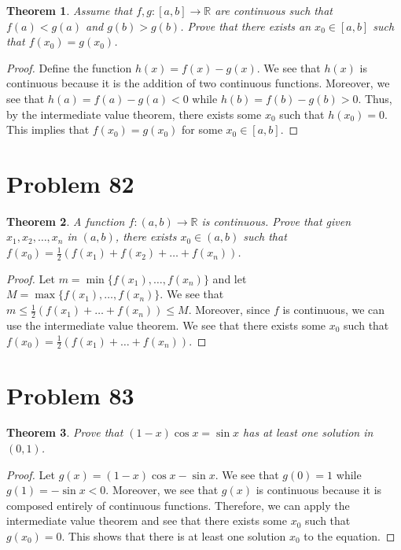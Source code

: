 \documentclass[psamsfonts]{amsart}
\newtheorem{thm}{Theorem}[section]
\theoremstyle{definition}
\theoremstyle{remark}
\numberwithin{equation}{section}
\begin{document}
\begin{thm}
Assume that $f,g: [a,b] \to \mathbb{R}$ are continuous such that $f(a) < g(a)$ and $g(b) > g(b)$. Prove that there exists an $x_0 \in [a,b]$ such that $f(x_0) = g(x_0)$. 
\end{thm}

\begin{proof}
Define the function $h(x) = f(x) - g(x)$. We see that $h(x)$ is continuous because it is the addition of two continuous functions. Moreover, we see that $h(a) = f(a) - g(a) < 0$ while $h(b) = f(b) - g(b) > 0$. Thus, by the intermediate value theorem, there exists some $x_0$ such that $h(x_0) = 0$. This implies that $f(x_0) = g(x_0)$ for some $x_0 \in [a,b]$.
\end{proof}

\section{Problem 82}

\begin{thm}
A function $f: (a,b) \to \mathbb{R}$ is continuous. Prove that given $x_1, x_2, \ldots, x_n$ in $(a,b)$, there exists $x_0 \in (a,b)$ such that $f(x_0) = \frac{1}{2} ( f(x_1) + f(x_2) + \ldots + f(x_n))$. 
\end{thm}

\begin{proof}
Let $m = \min \{f(x_1), \ldots, f(x_n) \}$ and let $M = \max \{ f(x_1), \ldots, f(x_n) \}$. We see that $m \leq \frac{1}{2}( f(x_1) + \ldots + f(x_n)) \leq M$. Moreover, since $f$ is continuous, we can use the intermediate value theorem. We see that there exists some $x_0$ such that $f(x_0) =  \frac{1}{2}( f(x_1) + \ldots + f(x_n))$. 
\end{proof}

\section{Problem 83}

\begin{thm}
Prove that $(1-x) \cos x = \sin x$ has at least one solution in $(0,1)$.
\end{thm}

\begin{proof}
Let $g(x) = (1-x) \cos x - \sin x$. We see that $g(0) = 1$ while $g(1) = - \sin x < 0$. Moreover, we see that $g(x)$ is continuous because it is composed entirely of continuous functions. Therefore, we can apply the intermediate value theorem and see that there exists some $x_0$ such that $g(x_0) = 0$. This shows that there is at least one solution $x_0$ to the equation.
\end{proof}
\end{document}
